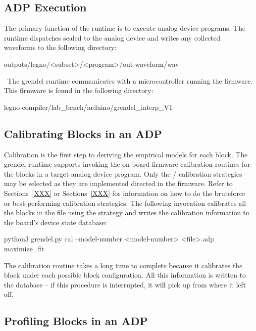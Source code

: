 \subsection{ADP Execution}

The primary function of the \grendel runtime is to execute analog device
programs. The \grendel runtime dispatches scaled  to the analog device and
writes any collected waveforms to the following directory:

\begin{snippet}
  outputs/legno/<subset>/<program>/out-waveform/wav
\end{snippet}

\noindent~The grendel runtime communicates with a microcontroller running the \grendel
firmware. This firmware is found in the following directory:

\begin{snippet}
  legno-compiler/lab_bench/arduino/grendel_interp_V1
\end{snippet}

\subsection{Calibrating Blocks in an ADP}

Calibration is the first step to deriving the empirical models for each block.
The grendel runtime supports invoking the on-board firmware calibration routines
for the blocks in a target analog device program. Only the 
/ calibration strategies may be selected as
they are implemented directed in the firmware. Refer to Sections~\ref{XXX} or
Sections~\ref{XXX} for information on how to do the bruteforce or best-performing
calibration strategies. The following invocation calibrates all the blocks in
the file  using the  strategy and writes the
calibration information to the board's device state database: 

\begin{snippet}
  python3 grendel.py cal --model-number <model-number> <file>.adp maximize_fit
\end{snippet}

The calibration routine takes a long time to complete because it calibrates the
block under each possible block configuration. All this information is written to the
 database -- if this procedure is interrupted, it will
pick up from where it left off. 


\subsection{Profiling Blocks in an ADP}

